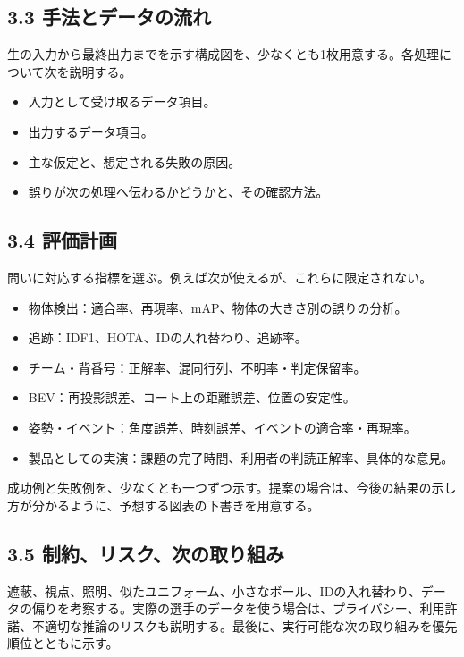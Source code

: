 \documentclass[11pt,a4paper]{article}
\begin{document}
\subsection{3.3 手法とデータの流れ}

生の入力から最終出力までを示す構成図を、少なくとも1枚用意する。各処理について次を説明する。

\begin{itemize}[leftmargin=1.6em,itemsep=3pt]
  \item 入力として受け取るデータ項目。
  \item 出力するデータ項目。
  \item 主な仮定と、想定される失敗の原因。
  \item 誤りが次の処理へ伝わるかどうかと、その確認方法。
\end{itemize}

\subsection{3.4 評価計画}

問いに対応する指標を選ぶ。例えば次が使えるが、これらに限定されない。

\begin{itemize}[leftmargin=1.6em,itemsep=3pt]
  \item 物体検出：適合率、再現率、mAP、物体の大きさ別の誤りの分析。
  \item 追跡：IDF1、HOTA、IDの入れ替わり、追跡率。
  \item チーム・背番号：正解率、混同行列、不明率・判定保留率。
  \item BEV：再投影誤差、コート上の距離誤差、位置の安定性。
  \item 姿勢・イベント：角度誤差、時刻誤差、イベントの適合率・再現率。
  \item 製品としての実演：課題の完了時間、利用者の判読正解率、具体的な意見。
\end{itemize}

成功例と失敗例を、少なくとも一つずつ示す。提案の場合は、今後の結果の示し方が分かるように、予想する図表の下書きを用意する。

\subsection{3.5 制約、リスク、次の取り組み}

遮蔽、視点、照明、似たユニフォーム、小さなボール、IDの入れ替わり、データの偏りを考察する。実際の選手のデータを使う場合は、プライバシー、利用許諾、不適切な推論のリスクも説明する。最後に、実行可能な次の取り組みを優先順位とともに示す。
\end{document}
